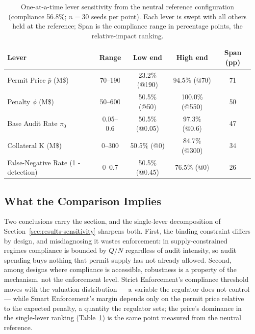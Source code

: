 \begin{table}[htbp]
\centering
\caption{One-at-a-time lever sensitivity from the neutral reference configuration (compliance 56.8\%; $n = 30$ seeds per point). Each lever is swept with all others held at the reference; Span is the compliance range in percentage points, the relative-impact ranking.}
\label{tab:lever-sensitivity}
\small
\begin{tabular}{@{}lcccc@{}}
\toprule
\textbf{Lever} & \textbf{Range} & \textbf{Low end} & \textbf{High end} & \textbf{Span (pp)} \\
\midrule
Permit Price $\bar{p}$ (M\$) & 70--190 & 23.2\% (@190) & 94.5\% (@70) & 71 \\
Penalty $\phi$ (M\$) & 50--600 & 50.5\% (@50) & 100.0\% (@550) & 50 \\
Base Audit Rate $\pi_0$ & 0.05--0.6 & 50.5\% (@0.05) & 97.3\% (@0.6) & 47 \\
Collateral K (M\$) & 0--300 & 50.5\% (@0) & 84.7\% (@300) & 34 \\
False-Negative Rate (1 - detection) & 0--0.7 & 50.5\% (@0.45) & 76.5\% (@0) & 26 \\
\bottomrule
\end{tabular}
\end{table}

\subsection{What the Comparison Implies}

Two conclusions carry the section, and the single-lever decomposition of Section~\ref{sec:results-sensitivity} sharpens both. First, the binding constraint differs by design, and misdiagnosing it wastes enforcement: in supply-constrained regimes compliance is bounded by $Q/N$ regardless of audit intensity, so audit spending buys nothing that permit supply has not already allowed. Second, among designs where compliance is accessible, robustness is a property of the mechanism, not the enforcement level. Strict Enforcement's compliance threshold moves with the valuation distribution --- a variable the regulator does not control --- while Smart Enforcement's margin depends only on the permit price relative to the expected penalty, a quantity the regulator sets; the price's dominance in the single-lever ranking (Table~\ref{tab:lever-sensitivity}) is the same point measured from the neutral reference.
